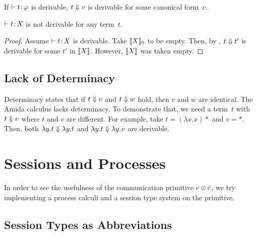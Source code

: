    \begin{corollary}
    \label{convergence}
    If $\vdash{t} \mathord{\colon\kern -2pt}{\varphi}$ is derivable,
    $t\Downarrow v$ is derivable for some canonical form~$v$.
   \end{corollary}

   \begin{corollary}
    \label{consistent-amida}
    $\vdash{t} \mathord{\colon\kern -2pt}{X}$ is not derivable for any term~$t$.
   \end{corollary}
    \begin{proof}
     Assume $\vdash{t} \mathord{\colon\kern -2pt}{X}$ is derivable.
     Take $\llbracket{X}\rrbracket_0$ to be empty.
     Then, by ,
     $t\Downarrow t'$ is derivable for some $t'$ in $\llbracket{X}\rrbracket$.
     However, $\llbracket{X}\rrbracket$ was taken empty.
    \end{proof}

    \subsection{Lack of Determinacy}

    Determinacy states that if $t\Downarrow v$ and $t\Downarrow w$ hold,
    then $v$ and $w$ are identical.
    The Amida calculus lacks determinacy.
    To demonstrate that, we need a term~$t$ with $t\Downarrow v$ where $t$
    and $v$ are different. For example, take $t = (\lambda x. x)\ast$
    and $v = \ast$.
    Then, both $\lambda y.t\Downarrow \lambda y.t$ and $\lambda y.t\Downarrow
    \lambda y.v$ are derivable.

    \section{Sessions and Processes}
    \label{sec:session-process}

    In order to see the usefulness of the communication primitive
    $c\otimes \bar{c}$,
    we try implementing a process calculi and a session type system on
    the primitive.

    \subsection{Session Types as Abbreviations}

